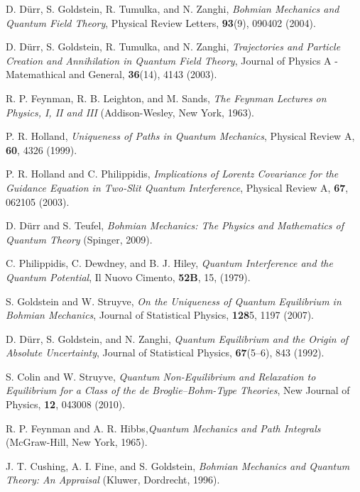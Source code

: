 \documentclass[onecolumn,nofootinbib, secnumarabic, amsmath, nobibnotes,11pt,aps,pra]{revtex4-1}
\begin{document}
\begin{thebibliography}{999}
D. D\"{u}rr, S. Goldstein, R. Tumulka, and N. Zanghi, \emph{Bohmian Mechanics and Quantum Field Theory}, Physical Review Letters, \textbf{93}(9),  090402 (2004).

D. D\"{u}rr, S. Goldstein, R. Tumulka, and N. Zanghi, \emph{Trajectories and Particle Creation and Annihilation in Quantum Field Theory}, Journal of Physics A - Matemathical and General, \textbf{36}(14),  4143 (2003).

 R. P. Feynman, R. B. Leighton, and M. Sands, \emph{The Feynman Lectures on Physics, I, II and III} (Addison-Wesley, New York, 1963).

P. R. Holland, \emph{Uniqueness of Paths in Quantum Mechanics}, Physical Review A, \textbf{60}, 4326 (1999).

P. R. Holland and C. Philippidis, \emph{Implications of Lorentz Covariance for the Guidance Equation in Two-Slit Quantum Interference}, Physical Review A, \textbf{67}, 062105 (2003).

D. D\"{u}rr and S. Teufel, \emph{Bohmian Mechanics: The Physics and Mathematics of Quantum Theory} (Spinger, 2009).

C. Philippidis, C. Dewdney, and B. J. Hiley, \emph{ Quantum Interference and the Quantum Potential},  Il Nuovo Cimento, {\bf 52B},  15, (1979).

S. Goldstein and W. Struyve, \emph{On the Uniqueness of Quantum Equilibrium in Bohmian Mechanics}, Journal of Statistical Physics, \textbf{128}5,  1197 (2007).

D. D\"{u}rr, S. Goldstein, and N. Zanghi, \emph{Quantum Equilibrium and the Origin of Absolute Uncertainty}, Journal of Statistical Physics, \textbf{67}(5--6),  843 (1992).

S. Colin and W. Struyve, \emph{Quantum Non-Equilibrium and Relaxation to Equilibrium for a Class of the de Broglie--Bohm-Type Theories}, New Journal of Physics, \textbf{12},  043008 (2010).

R. P. Feynman and A. R. Hibbs,\emph{Quantum Mechanics and Path Integrals} (McGraw-Hill, New York, 1965).

J. T. Cushing, A. I. Fine, and S. Goldstein, \emph{Bohmian Mechanics and Quantum Theory: An Appraisal} (Kluwer, Dordrecht, 1996).


\end{thebibliography}
\end{document}
